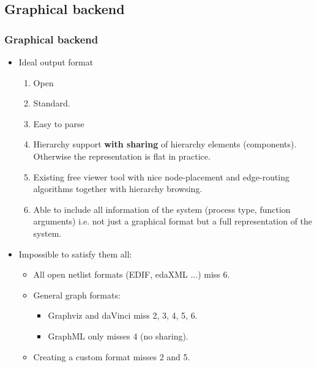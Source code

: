 \documentclass{beamer}
\begin{document}
\subsection{Graphical backend}
\begin{frame}
  \frametitle{Graphical backend}
\begin{itemize}
  \item Ideal output format
    \begin{enumerate}
    \item Open 
    \item Standard.
    \item Easy to parse
    \item Hierarchy support \textbf{with sharing} of hierarchy elements 
      (components). Otherwise the representation is flat in practice.
    \item Existing free viewer tool with nice node-placement and 
      edge-routing algorithms together with hierarchy browsing.
    \item Able to include all information of the system
      (process type, function arguments) i.e. not just a graphical
      format but a full representation of the system.
    \end{enumerate}
    \item Impossible to satisfy them all:
    \begin{itemize}
    \item All open netlist formats (EDIF, edaXML ...) miss 6.
    \item General graph formats:
      \begin{itemize}
        \item Graphviz and daVinci miss 2, 3, 4, 5, 6. 
        \item GraphML only misses 4 (no sharing).
      \end{itemize}
    \item Creating a custom format misses 2 and 5. 
    \end{itemize}
  \end{itemize}
\end{frame}
\end{document}
